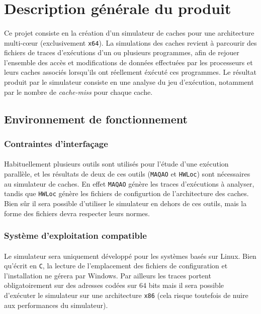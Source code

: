 \section{Description générale du produit}

\paragraph{}
Ce projet consiste en la création d'un simulateur de caches pour une architecture multi-c\oe ur (exclusivement \verb!x64!). La simulations des caches revient à parcourir des fichiers de traces d'exécutions d'un ou plusieurs programmes, afin de rejouer l'ensemble des accès et modifications de données effectuées par les processeurs et leurs caches associés lorsqu'ils ont réellement éxécuté ces programmes. Le résultat produit par le simulateur consiste en une analyse du jeu d'exécution, notamment par le nombre de \emph{cache-miss} pour chaque cache.

\subsection{Environnement de fonctionnement}

\subsubsection{Contraintes d'interfaçage}
\paragraph{}
Habituellement plusieurs outils sont utilisés pour l'étude d'une exécution parallèle, et les résultats de deux de ces outils (\texttt{MAQAO} et \texttt{HWLoc}) sont nécessaires au simulateur de caches. En effet \texttt{MAQAO} génère les traces d'exécutions à analyser, tandis que \texttt{HWLoc}
génère les fichiers de configurtion de l'architecture des caches. Bien sûr il sera possible d'utiliser le simulateur en dehors de ces outils, mais la forme des fichiers devra respecter leurs normes. 

\subsubsection{Système d'exploitation compatible}
\paragraph{}
Le simulateur sera uniquement développé pour les systèmes basés sur Linux. Bien qu'écrit en \texttt{C}, la lecture de l'emplacement des fichiers de configuration et l'installation ne gérera par Windows. Par ailleurs les traces portent obligatoirement sur des adresses codées sur 64 bits mais il sera possible d'exécuter le simulateur sur une architecture \verb!x86! (cela risque toutefois de nuire aux performances du simulateur).

